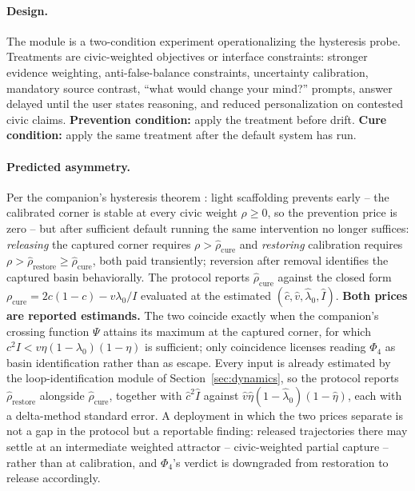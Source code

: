\documentclass[11pt]{article}
\theoremstyle{definition}
\theoremstyle{remark}
\numberwithin{equation}{section}
\begin{document}
\paragraph{Design.} The module is a two-condition experiment operationalizing the hysteresis probe. Treatments are civic-weighted objectives or interface constraints: stronger evidence weighting, anti-false-balance constraints, uncertainty calibration, mandatory source contrast, ``what would change your mind?'' prompts, answer delayed until the user states reasoning, and reduced personalization on contested civic claims. \textbf{Prevention condition:} apply the treatment before drift. \textbf{Cure condition:} apply the same treatment after the default system has run.

\paragraph{Predicted asymmetry.} Per the companion's hysteresis theorem \citep{hofheinz2026drift}: light scaffolding prevents early -- the calibrated corner is stable at every civic weight $\rho \ge 0$, so the prevention price is zero -- but after sufficient default running the same intervention no longer suffices: \emph{releasing} the captured corner requires $\rho > \hat\rho_{\mathrm{cure}}$ and \emph{restoring} calibration requires $\rho > \hat\rho_{\mathrm{restore}} \ge \hat\rho_{\mathrm{cure}}$, both paid transiently; reversion after removal identifies the captured basin behaviorally. The protocol reports $\hat\rho_{\mathrm{cure}}$ against the closed form $\rho_{\mathrm{cure}} = 2c(1-c) - v\lambda_0/I$ evaluated at the estimated $(\hat c, \hat v, \hat\lambda_0, \hat I)$. \textbf{Both prices are reported estimands.} The two coincide exactly when the companion's crossing function $\Psi$ attains its maximum at the captured corner, for which $c^2 I < v\eta(1-\lambda_0)(1-\eta)$ is sufficient; only coincidence licenses reading $\Phi_4$ as basin identification rather than as escape. Every input is already estimated by the loop-identification module of Section~\ref{sec:dynamics}, so the protocol reports $\hat\rho_{\mathrm{restore}}$ alongside $\hat\rho_{\mathrm{cure}}$, together with $\hat c^2\hat I$ against $\hat v\hat\eta(1-\hat\lambda_0)(1-\hat\eta)$, each with a delta-method standard error. A deployment in which the two prices separate is not a gap in the protocol but a reportable finding: released trajectories there may settle at an intermediate weighted attractor -- civic-weighted partial capture -- rather than at calibration, and $\Phi_4$'s verdict is downgraded from restoration to release accordingly.
\end{document}
